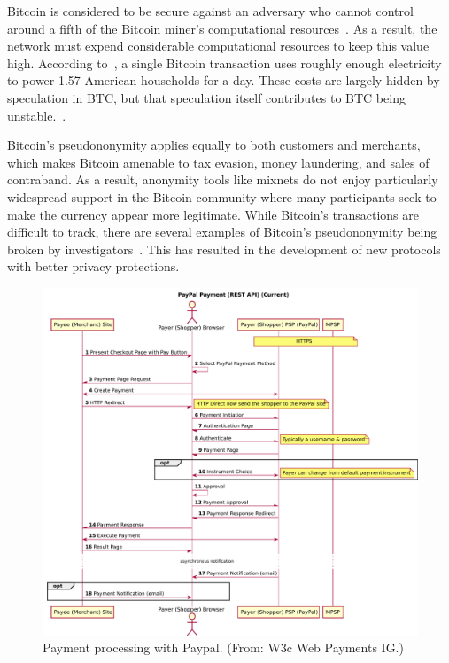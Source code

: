 \documentclass{llncs}
\begin{document}
Bitcoin is considered to be secure against an adversary who cannot
control around a fifth of the Bitcoin miner's computational
resources~\cite{BTC:Bahack13,BTC:MajorityNotEnough,BTC:Eclipse}.  %
As a result, the network must expend considerable computational
resources to keep this value high.
According to~\cite{vice_btc_unsustainable}, a single Bitcoin transaction uses roughly enough
electricity to power 1.57 American households for a day.
These costs are largely hidden by speculation in BTC,
but that speculation itself contributes to BTC being
unstable.~\cite{jeffries_economists_v_btc,lehmann_btc_fools_gold,lewis_btc_is_junk}. %


Bitcoin's pseudononymity applies equally to both customers and
merchants, which makes Bitcoin amen\-able to tax evasion, money
laundering, and sales of contraband.  As a result, anonymity tools
like mixnets do not enjoy particularly widespread support in the
Bitcoin community where many participants seek to make the currency
appear more legitimate.  While Bitcoin's transactions are difficult to
track, there are several examples of Bitcoin's pseudononymity being
broken by investigators~\cite{BTC:Anonymity}.  This has resulted in
the development of new protocols with better privacy protections.

\begin{figure}[t!]
\includegraphics[width=\textwidth]{figs/paypal.pdf}
\caption{Payment processing with Paypal. (From: W3c Web Payments IG.)}
\label{fig:paypal}
\end{figure}
\end{document}
